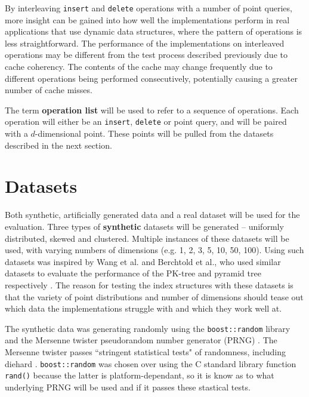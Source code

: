 By interleaving \texttt{insert} and \texttt{delete} operations with a number of point queries, more insight can be gained into how well the implementations perform in real applications that use dynamic data structures, where the pattern of operations is less straightforward. The performance of the implementations on interleaved operations may be different from the test process described previously due to cache coherency. The contents of the cache may change frequently due to different operations being performed consecutively, potentially causing a greater number of cache misses.

The term \textbf{operation list} will be used to refer to a sequence of operations. Each operation will either be an \texttt{insert}, \texttt{delete} or point query, and will be paired with a $d$-dimensional point. These points will be pulled from the datasets described in the next section.


\section{Datasets}
\label{sec:datasets}

Both synthetic, artificially generated data and a real dataset will be used for the evaluation. Three types of \textbf{synthetic} datasets will be generated -- uniformly distributed, skewed and clustered. Multiple instances of these datasets will be used, with varying numbers of dimensions (e.g. 1, 2, 3, 5, 10, 50, 100). Using such datasets was inspired by Wang et al. and Berchtold et al., who used similar datasets to evaluate the performance of the PK-tree and pyramid tree respectively \cite{pk-tree, pyramid-tree}. The reason for testing the index structures with these datasets is that the variety of point distributions and number of dimensions should tease out which data the implementations struggle with and which they work well at.

The synthetic data was generating randomly using the \texttt{boost::random} library and the Mersenne twister pseudorandom number generator (PRNG) \cite{mersenne-twister}.  The Mersenne twister passes ``stringent statistical tests" of randomness, including diehard \cite{mersenne-twister}. \texttt{boost::random} was chosen over using the C standard library function \texttt{rand()} because the latter is platform-dependant, so it is know as to what underlying PRNG will be used and if it passes these stastical tests.

